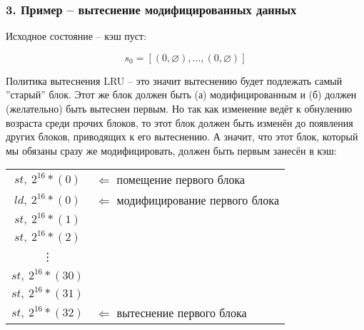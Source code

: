 
\subsubsection*{3. Пример -- вытеснение модифицированных данных}

Исходное состояние -- кэш пуст:

$$s_0 = [(0, \varnothing),...,(0, \varnothing)]$$

Политика вытеснения LRU -- это значит вытеснению будет подлежать самый ''старый'' блок. Этот же блок должен быть (а) модифицированным и (б) должен (желательно) быть вытеснен первым. Но так как изменение ведёт к обнулению возраста среди прочих блоков, то этот блок должен быть изменён до появления других блоков, приводящих к его вытеснению. А значит, что этот блок, который мы обязаны сразу же модифицировать, должен быть первым занесён в кэш:

\begin{table*}
	\centering
	\begin{tabular}{cl}
		$st,~2^{16}*(0)$ & $\Leftarrow$ помещение первого блока \\
		$ld,~2^{16}*(0)$ & $\Leftarrow$ модифицирование первого блока \\
		$st,~2^{16}*(1)$ &  \\
		$st,~2^{16}*(2)$ &  \\
		\vdots &  \\
		$st,~2^{16}*(30)$ &  \\
		$st,~2^{16}*(31)$ &  \\
		$st,~2^{16}*(32)$ & $\Leftarrow$ вытеснение первого блока \\
	\end{tabular}
\end{table*}